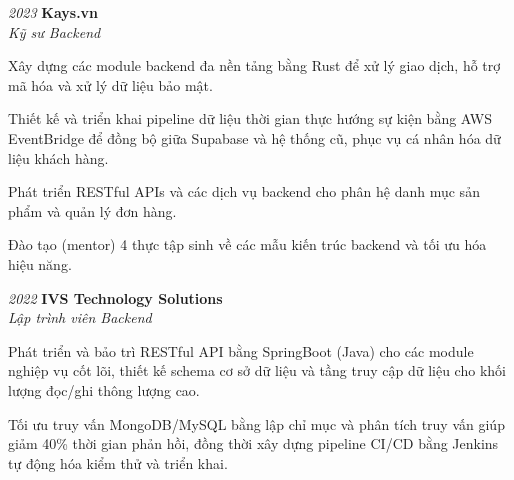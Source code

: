 \begin{twocolentry}{\textit{2023}}
    \textbf{Kays.vn} \\[4pt]
    \textit{Kỹ sư Backend}
\end{twocolentry}
\begin{onecolentry}
    \begin{highlights}
        \item Xây dựng các module backend đa nền tảng bằng Rust để xử lý giao dịch, hỗ trợ mã hóa và xử lý dữ liệu bảo mật.
        \item Thiết kế và triển khai pipeline dữ liệu thời gian thực hướng sự kiện bằng AWS EventBridge để đồng bộ giữa Supabase và hệ thống cũ, phục vụ cá nhân hóa dữ liệu khách hàng.
        \item Phát triển RESTful APIs và các dịch vụ backend cho phân hệ danh mục sản phẩm và quản lý đơn hàng.
        \item Đào tạo (mentor) 4 thực tập sinh về các mẫu kiến trúc backend và tối ưu hóa hiệu năng.
    \end{highlights}
\end{onecolentry}
\vspace{0.2 cm}

\begin{twocolentry}{\textit{2022}}
    \textbf{IVS Technology Solutions} \\[4pt]
    \textit{Lập trình viên Backend}
\end{twocolentry}
\begin{onecolentry}
    \begin{highlights}
        \item Phát triển và bảo trì RESTful API bằng SpringBoot (Java) cho các module nghiệp vụ cốt lõi, thiết kế schema cơ sở dữ liệu và tầng truy cập dữ liệu cho khối lượng đọc/ghi thông lượng cao.
        \item Tối ưu truy vấn MongoDB/MySQL bằng lập chỉ mục và phân tích truy vấn giúp giảm 40\% thời gian phản hồi, đồng thời xây dựng pipeline CI/CD bằng Jenkins tự động hóa kiểm thử và triển khai.
    \end{highlights}
\end{onecolentry}

